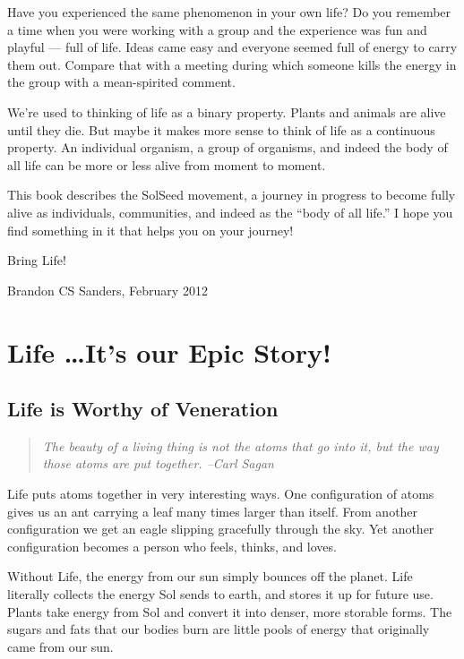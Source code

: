 \documentclass[ebook,11pt,openany,twoside,showtrims]{memoir}
\newcommand{\imagefacingchapter}[1]{
  \cleartoverso
  \clearpage \null
  \thispagestyle{cleared}
  \AddToShipoutPictureBG*{%
    \AtStockLowerLeft{%
      \texttt{[image: \#1]}
    }
  }
  \clearpage
}
\begin{document}
Have you experienced the same phenomenon in your own life? Do you remember a
time when you were working with a group and the experience was fun and playful
--- full of life. Ideas came easy and everyone seemed full of energy to carry
them out. Compare that with a meeting during which someone kills the energy in
the group with a mean-spirited comment.

We're used to thinking of life as a binary property. Plants and animals are
alive until they die. But maybe it makes more sense to think of life as a
continuous property. An individual organism, a group of organisms, and indeed
the body of all life can be more or less alive from moment to moment.

This book describes the SolSeed movement, a journey in progress to become fully
alive as individuals, communities, and indeed as the ``body of all life.'' I
hope you find something in it that helps you on your journey!

Bring Life!

Brandon CS Sanders, February 2012

\clearpage \null
\thispagestyle{cleared}

\cleartorecto
\thispagestyle{cleared}
\part{Life \ldots It's our Epic Story!}

\imagefacingchapter{images/LifeIsWorthyOfVeneration}
\pagestyle{plain}
\chapter{Life is Worthy of Veneration}


\begin{quote}
{\em The beauty of a living thing is not the atoms that go into it, but the way
those atoms are put together. --Carl Sagan}
\end{quote}

Life puts atoms together in very interesting ways. One configuration of atoms
gives us an ant carrying a leaf many times larger than itself. From another
configuration we get an eagle slipping gracefully through the sky. Yet another
configuration becomes a person who feels, thinks, and loves.

Without Life, the energy from our sun simply bounces off the planet. Life
literally collects the energy Sol sends to earth, and stores it up for future
use. Plants take energy from Sol and convert it into denser, more storable
forms. The sugars and fats that our bodies burn are little pools of energy that
originally came from our sun.
\end{document}
